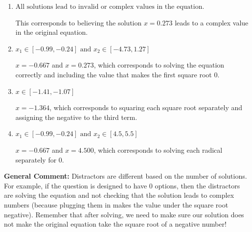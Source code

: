 \documentclass{extbook}[14pt]
\begin{document}
\begin{enumerate}
{\begin{enumerate}[label=\Alph*.]
* $x = 0.273$, which is the correct option.
\item \( \text{All solutions lead to invalid or complex values in the equation.} \)

This corresponds to believing the solution $x = 0.273$ leads to a complex value in the original equation.
\item \( x_1 \in [-0.99, -0.24] \text{ and } x_2 \in [-4.73,1.27] \)

$x = -0.667$ and $x = 0.273$, which corresponds to solving the equation correctly and including the value that makes the first square root 0.
\item \( x \in [-1.41,-1.07] \)

$x = -1.364$, which corresponds to squaring each square root separately and assigning the negative to the third term.
\item \( x_1 \in [-0.99, -0.24] \text{ and } x_2 \in [4.5,5.5] \)

$x = -0.667$ and $x = 4.500$, which corresponds to solving each radical separately for 0.
\end{enumerate}

\textbf{General Comment:} Distractors are different based on the number of solutions. For example, if the question is designed to have 0 options, then the distractors are solving the equation and not checking that the solution leads to complex numbers (because plugging them in makes the value under the square root negative). Remember that after solving, we need to make sure our solution does not make the original equation take the square root of a negative number!
}
\end{enumerate}
\end{document}
